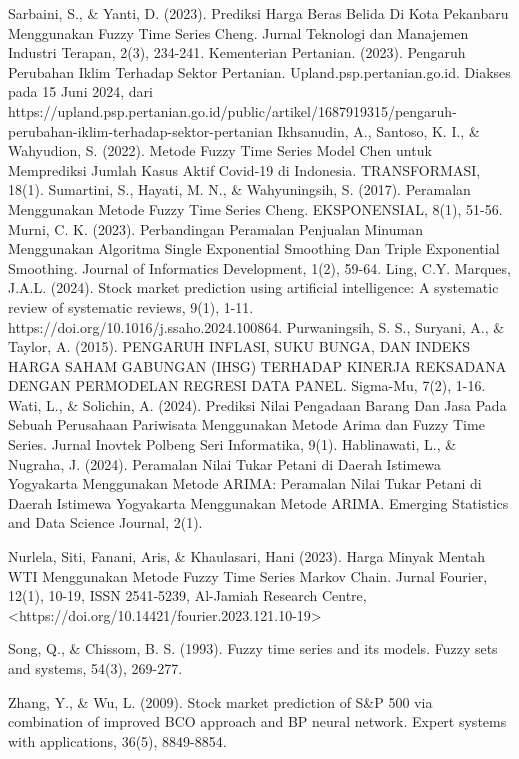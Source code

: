 \documentclass[conference]{IEEEtran}
\begin{document}
\begin{thebibliography}{00}
 Sarbaini, S., \& Yanti, D. (2023). Prediksi Harga Beras Belida Di Kota Pekanbaru Menggunakan Fuzzy Time Series Cheng. Jurnal Teknologi dan Manajemen Industri Terapan, 2(3), 234-241.
 Kementerian Pertanian. (2023). Pengaruh Perubahan Iklim Terhadap Sektor Pertanian. Upland.psp.pertanian.go.id. Diakses pada 15 Juni 2024, dari https://upland.psp.pertanian.go.id/public/artikel/1687919315/pengaruh-perubahan-iklim-terhadap-sektor-pertanian
 Ikhsanudin, A., Santoso, K. I., \& Wahyudion, S. (2022). Metode Fuzzy Time Series Model Chen untuk Memprediksi Jumlah Kasus Aktif Covid-19 di Indonesia. TRANSFORMASI, 18(1).
 Sumartini, S., Hayati, M. N., \& Wahyuningsih, S. (2017). Peramalan Menggunakan Metode Fuzzy Time Series Cheng. EKSPONENSIAL, 8(1), 51-56.
 Murni, C. K. (2023). Perbandingan Peramalan Penjualan Minuman Menggunakan Algoritma Single Exponential Smoothing Dan Triple Exponential Smoothing. Journal of Informatics Development, 1(2), 59-64.
 Ling, C.Y. Marques, J.A.L. (2024). Stock market prediction using artificial intelligence: A systematic review of systematic reviews, 9(1), 1-11. https://doi.org/10.1016/j.ssaho.2024.100864.
 Purwaningsih, S. S., Suryani, A., \& Taylor, A. (2015). PENGARUH INFLASI, SUKU BUNGA, DAN INDEKS HARGA SAHAM GABUNGAN (IHSG) TERHADAP KINERJA REKSADANA DENGAN PERMODELAN REGRESI DATA PANEL. Sigma-Mu, 7(2), 1-16.
 Wati, L., \& Solichin, A. (2024). Prediksi Nilai Pengadaan Barang Dan Jasa Pada Sebuah Perusahaan Pariwisata Menggunakan Metode Arima dan Fuzzy Time Series. Jurnal Inovtek Polbeng Seri Informatika, 9(1).
 Hablinawati, L., \& Nugraha, J. (2024). Peramalan Nilai Tukar Petani di Daerah Istimewa Yogyakarta Menggunakan Metode ARIMA: Peramalan Nilai Tukar Petani di Daerah Istimewa Yogyakarta Menggunakan Metode ARIMA. Emerging Statistics and Data Science Journal, 2(1).

 Nurlela, Siti, Fanani, Aris, \& Khaulasari, Hani (2023). Harga Minyak Mentah WTI Menggunakan Metode Fuzzy Time Series Markov Chain. Jurnal Fourier, 12(1), 10-19, ISSN 2541-5239, Al-Jamiah Research Centre, <https://doi.org/10.14421/fourier.2023.121.10-19>

 Song, Q., \& Chissom, B. S. (1993). Fuzzy time series and its models. Fuzzy sets and systems, 54(3), 269-277.

 Zhang, Y., \& Wu, L. (2009). Stock market prediction of S\&P 500 via combination of improved BCO approach and BP neural network. Expert systems with applications, 36(5), 8849-8854.


\end{thebibliography}
\end{document}
